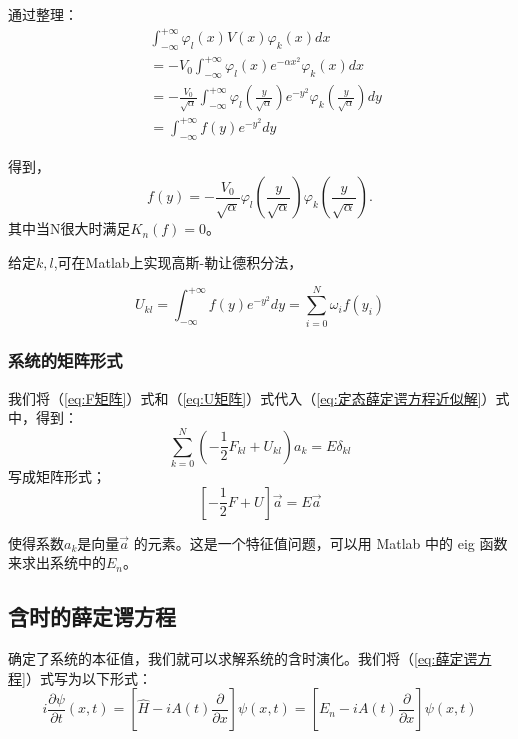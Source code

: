 \documentclass[12pt]{ctexart}
\numberwithin{equation}{section} %
\begin{document}
通过整理：
\begin{equation}
    \begin{aligned}
        & \int_{-\infty}^{+\infty}\varphi_{l}(x)V(x)\varphi_{k}(x)dx \\
        & = -V_{0}\int_{-\infty}^{+\infty}\varphi_{l}(x)e^{-\alpha x^{2}}\varphi_{k}(x)dx \\
        & = -\frac{V_{0}}{\sqrt{\alpha}}\int_{-\infty}^{+\infty}\varphi_{l}\left(\frac{y}{\sqrt{\alpha}}\right)e^{-y^{2}}\varphi_{k}\left(\frac{y}{\sqrt{\alpha}}\right)dy \\
        & = \int_{-\infty}^{+\infty}f(y)e^{-y^{2}}dy
    \end{aligned}
    \end{equation}
     

得到，$$f(y)=-\frac{V_{0}}{\sqrt{\alpha}}\varphi_{l}(\frac{y}{\sqrt{\alpha}})\varphi_{k}(\frac{y}{\sqrt{\alpha}}).$$其中当N很大时满足\( K_n(f) = 0 \)。

给定$k,l$,可在Matlab上实现高斯-勒让德积分法，

\begin{equation}
        \boxed{ U_{kl}=\int_{-\infty}^{+\infty}f(y)e^{-y^2}dy=\sum_{i=0}^{N}\omega_if(y_i)}
        \label{eq:U矩阵}
\end{equation}
     
\subsubsection{系统的矩阵形式}
我们将（\ref{eq:F矩阵}）式和（\ref{eq:U矩阵}）式代入（\ref{eq:定态薛定谔方程近似解}）式中，得到：
\begin{equation}
    \sum_{k=0}^{N} (-\frac{1}{2}F_{kl}+U_{kl})a_k=E\delta_{kl}
\end{equation}
写成矩阵形式；
\begin{equation}
        \boxed{ \left[-\frac{1}{2}F+U\right]\vec{a}=E\vec{a}}
\end{equation}

使得系数$a_k$是向量$\vec{a}$ 的元素。这是一个特征值问题，可以用 Matlab 中的 eig 函数来求出系统中的$E_n$。
\subsection{含时的薛定谔方程}
确定了系统的本征值，我们就可以求解系统的含时演化。我们将（\ref{eq:薛定谔方程}）式写为以下形式：
\begin{equation}
    i\dfrac{\partial\psi}{\partial t}(x,t)=\left[\hat{H}-iA(t)\dfrac{\partial}{\partial x}\right]\psi(x,t)=\left[E_n-iA(t)\dfrac{\partial}{\partial x}\right]\psi(x,t)
\label{eq:系统的本征方程}
\end{equation}
\end{document}
